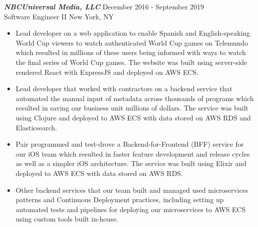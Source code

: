 {\sl \textbf{NBCUniversal Media, LLC}} \hfill December 2016 - September 2019 \\ Software Engineer II \hfill New York, NY
\begin{itemize}
    \item Lead developer on a web application to enable Spanish and English-speaking World Cup viewers to watch authenticated World Cup games on Telemundo which resulted in millions of these users being informed with ways to watch the final series of World Cup games. The website was built using server-side rendered React with ExpressJS and deployed on AWS ECS.
    \item Lead developer that worked with contractors on a backend service that automated the manual input of metadata across thousands of programs which resulted in saving our business unit millions of dollars. The service was built using Clojure and deployed to AWS ECS with data stored on AWS RDS and Elasticsearch.
    \item Pair programmed and test-drove a Backend-for-Frontend (BFF) service for our iOS team which resulted in faster feature development and release cycles as well as a simpler iOS architecture. The service was built using Elixir and deployed to AWS ECS with data stored on AWS RDS.
    \item Other backend services that our team built and managed used microservices patterns and Continuous Deployment practices, including setting up automated tests and pipelines for deploying our microservices to AWS ECS using custom tools built in-house.
\end{itemize}
